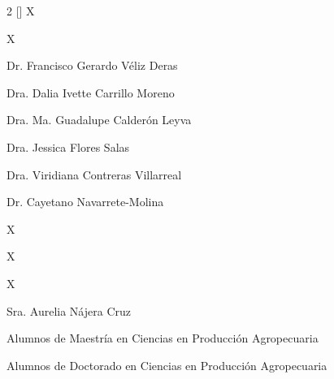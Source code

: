 \begin{multicols}{2}
[]
\centering
{}
X

X


Dr. Francisco Gerardo Véliz Deras

Dra. Dalia Ivette Carrillo Moreno

Dra. Ma. Guadalupe Calderón Leyva

Dra. Jessica Flores Salas

Dra. Viridiana Contreras Villarreal

Dr. Cayetano Navarrete-Molina

X

X

X

Sra. Aurelia Nájera Cruz

Alumnos de Maestría en Ciencias en Producción Agropecuaria

Alumnos de Doctorado en Ciencias en Producción Agropecuaria

\end{multicols}
